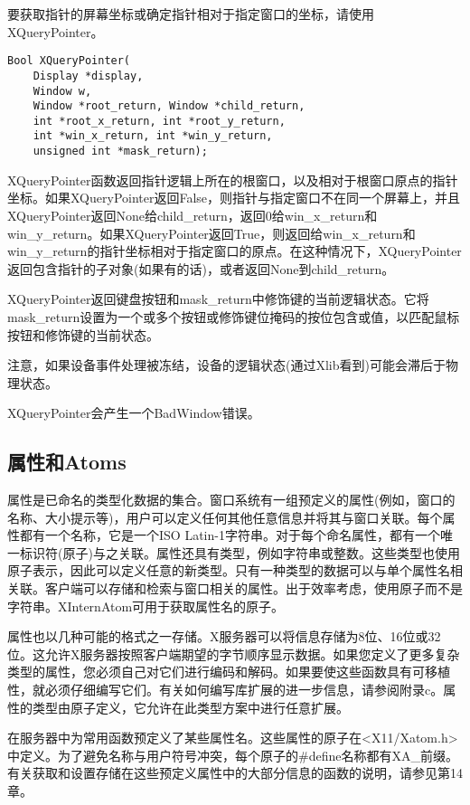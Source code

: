 要获取指针的屏幕坐标或确定指针相对于指定窗口的坐标，请使用XQueryPointer。

\begin{lstlisting}
Bool XQueryPointer(
	Display *display,
	Window w,
	Window *root_return, Window *child_return,
	int *root_x_return, int *root_y_return,
	int *win_x_return, int *win_y_return,
	unsigned int *mask_return);
\end{lstlisting}

XQueryPointer函数返回指针逻辑上所在的根窗口，以及相对于根窗口原点的指针坐标。如果XQueryPointer返回False，则指针与指定窗口不在同一个屏幕上，并且XQueryPointer返回None给child\_return，返回0给win\_x\_return和win\_y\_return。如果XQueryPointer返回True，则返回给win\_x\_return和win\_y\_return的指针坐标相对于指定窗口的原点。在这种情况下，XQueryPointer返回包含指针的子对象(如果有的话)，或者返回None到child\_return。

XQueryPointer返回键盘按钮和mask\_return中修饰键的当前逻辑状态。它将mask\_return设置为一个或多个按钮或修饰键位掩码的按位包含或值，以匹配鼠标按钮和修饰键的当前状态。

注意，如果设备事件处理被冻结，设备的逻辑状态(通过Xlib看到)可能会滞后于物理状态。

XQueryPointer会产生一个BadWindow错误。

\subsection{属性和Atoms}

属性是已命名的类型化数据的集合。窗口系统有一组预定义的属性(例如，窗口的名称、大小提示等)，用户可以定义任何其他任意信息并将其与窗口关联。每个属性都有一个名称，它是一个ISO Latin-1字符串。对于每个命名属性，都有一个唯一标识符(原子)与之关联。属性还具有类型，例如字符串或整数。这些类型也使用原子表示，因此可以定义任意的新类型。只有一种类型的数据可以与单个属性名相关联。客户端可以存储和检索与窗口相关的属性。出于效率考虑，使用原子而不是字符串。XInternAtom可用于获取属性名的原子。

属性也以几种可能的格式之一存储。X服务器可以将信息存储为8位、16位或32位。这允许X服务器按照客户端期望的字节顺序显示数据。如果您定义了更多复杂类型的属性，您必须自己对它们进行编码和解码。如果要使这些函数具有可移植性，就必须仔细编写它们。有关如何编写库扩展的进一步信息，请参阅附录c。属性的类型由原子定义，它允许在此类型方案中进行任意扩展。

在服务器中为常用函数预定义了某些属性名。这些属性的原子在<X11/Xatom.h>中定义。为了避免名称与用户符号冲突，每个原子的\#define名称都有XA\_前缀。有关获取和设置存储在这些预定义属性中的大部分信息的函数的说明，请参见第14章。

